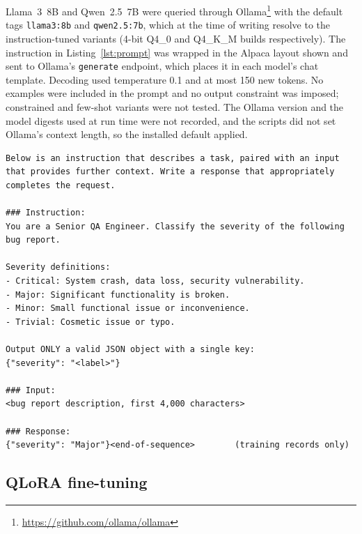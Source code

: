 \documentclass[a4paper,fleqn]{cas-sc}
\begin{document}
Llama~3~8B and Qwen~2.5~7B were queried through Ollama\footnote{\url{https://github.com/ollama/ollama}}
with the default tags \texttt{llama3:8b} and \texttt{qwen2.5:7b}, which at the time of
writing resolve to the instruction-tuned variants (4-bit Q4\_0 and Q4\_K\_M builds
respectively). The
instruction in Listing~\ref{lst:prompt} was wrapped in the Alpaca layout shown and sent
to Ollama's \texttt{generate} endpoint, which places it in each model's chat template.
Decoding used temperature 0.1 and at most 150 new tokens. No examples were included in
the prompt and no output constraint was imposed; constrained and few-shot variants were
not tested. The Ollama version and the model digests used at run time were not recorded,
and the scripts did not set Ollama's context length, so the installed default applied.

\begin{lstlisting}[float=tb, caption={Instruction and layout used for zero-shot prompting and,
with the gold answer appended, for every fine-tuning record. The fine-tuned models
receive the same text at inference and are expected to complete the response.},
label={lst:prompt}]
Below is an instruction that describes a task, paired with an input that provides further context. Write a response that appropriately completes the request.

### Instruction:
You are a Senior QA Engineer. Classify the severity of the following bug report.

Severity definitions:
- Critical: System crash, data loss, security vulnerability.
- Major: Significant functionality is broken.
- Minor: Small functional issue or inconvenience.
- Trivial: Cosmetic issue or typo.

Output ONLY a valid JSON object with a single key:
{"severity": "<label>"}

### Input:
<bug report description, first 4,000 characters>

### Response:
{"severity": "Major"}<end-of-sequence>        (training records only)
\end{lstlisting}

\subsection{QLoRA fine-tuning}
\label{sec:qlora}
\end{document}
